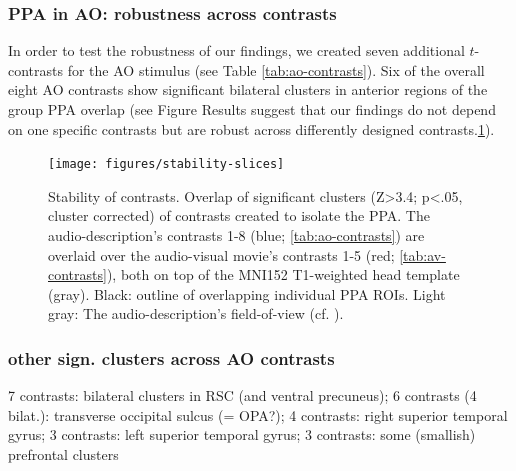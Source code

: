 \documentclass[english]{article}
\begin{document}
\subsubsection{PPA in AO: robustness across contrasts}


In order to test the robustness of our findings, we created seven additional
$t$-contrasts for the AO stimulus (see Table \ref{tab:ao-contrasts}).
Six of the overall eight AO contrasts show significant bilateral clusters in
anterior regions of the group PPA overlap (see Figure
Results suggest that our findings do not depend on one specific contrasts but
are robust across differently designed
contrasts.\ref{fig:stability-slices}).



\begin{figure} \centering
    \texttt{[image: figures/stability-slices]}
    \caption{Stability of contrasts. Overlap of significant clusters (Z>3.4;
        p<.05, cluster corrected) of contrasts created to isolate the PPA.
        The audio-description's contrasts 1-8 (blue; \ref{tab:ao-contrasts})
        are overlaid over the audio-visual movie's contrasts 1-5 (red;
        \ref{tab:av-contrasts}), both on top of the MNI152 T1-weighted head
        template (gray).
        Black: outline of overlapping individual PPA ROIs.
        Light gray: The audio-description's field-of-view (cf.
        \citep{hanke2014audiomovie}).}
    \label{fig:stability-slices}
    \end{figure}


\subsubsection{other sign. clusters across AO contrasts}
7 contrasts: bilateral clusters in RSC (and ventral precuneus);
6 contrasts (4 bilat.): transverse occipital sulcus (= OPA?);
4 contrasts: right superior temporal gyrus; 3 contrasts: left superior temporal
gyrus; 3 contrasts: some (smallish) prefrontal clusters
\end{document}
